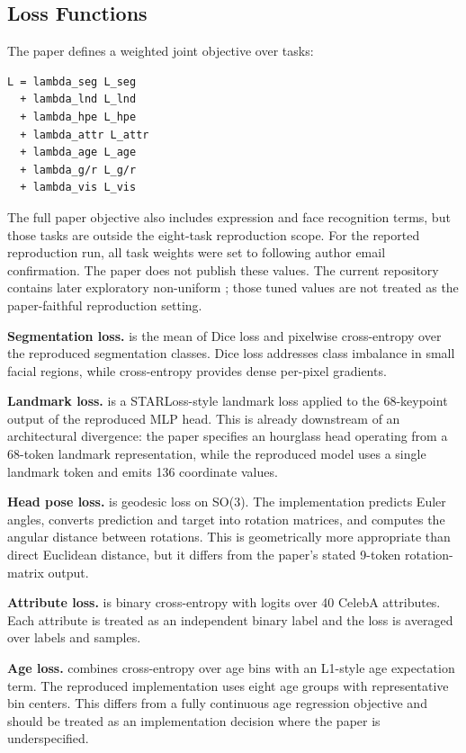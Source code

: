 \documentclass[11pt]{article}
\begin{document}
\subsection{Loss Functions}


The paper defines a weighted joint objective over tasks:


\begin{verbatim}
L = lambda_seg L_seg
  + lambda_lnd L_lnd
  + lambda_hpe L_hpe
  + lambda_attr L_attr
  + lambda_age L_age
  + lambda_g/r L_g/r
  + lambda_vis L_vis
\end{verbatim}

The full paper objective also includes expression and face recognition terms, but those tasks are outside the eight-task reproduction scope. For the reported reproduction run, all task weights were set to  following author email confirmation. The paper does not publish these values. The current repository contains later exploratory non-uniform ; those tuned values are not treated as the paper-faithful reproduction setting.


\textbf{Segmentation loss.}  is the mean of Dice loss and pixelwise cross-entropy over the reproduced segmentation classes. Dice loss addresses class imbalance in small facial regions, while cross-entropy provides dense per-pixel gradients.


\textbf{Landmark loss.}  is a STARLoss-style landmark loss applied to the 68-keypoint output of the reproduced MLP head. This is already downstream of an architectural divergence: the paper specifies an hourglass head operating from a 68-token landmark representation, while the reproduced model uses a single landmark token and emits 136 coordinate values.


\textbf{Head pose loss.}  is geodesic loss on SO(3). The implementation predicts Euler angles, converts prediction and target into rotation matrices, and computes the angular distance between rotations. This is geometrically more appropriate than direct Euclidean distance, but it differs from the paper's stated 9-token rotation-matrix output.


\textbf{Attribute loss.}  is binary cross-entropy with logits over 40 CelebA attributes. Each attribute is treated as an independent binary label and the loss is averaged over labels and samples.


\textbf{Age loss.}  combines cross-entropy over age bins with an L1-style age expectation term. The reproduced implementation uses eight age groups with representative bin centers. This differs from a fully continuous age regression objective and should be treated as an implementation decision where the paper is underspecified.
\end{document}
